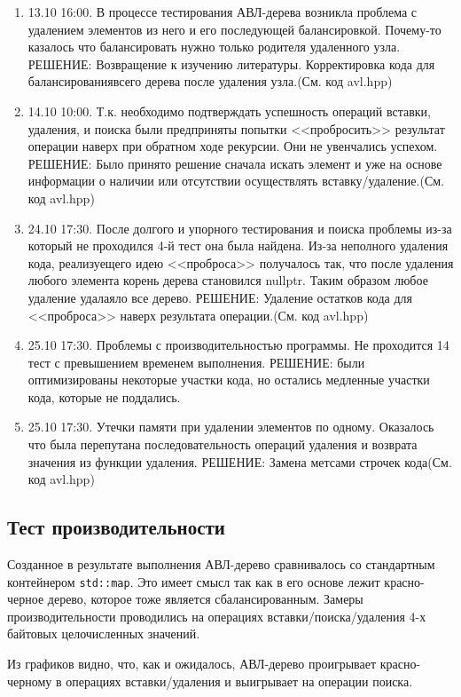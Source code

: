 \documentclass[12pt]{article}
\begin{document}
\begin{enumerate}
\item 13.10 16:00. В процессе тестирования АВЛ-дерева возникла проблема с удалением элементов из него и его последующей балансировкой. Почему-то казалось что балансировать нужно только родителя удаленного узла.
РЕШЕНИЕ: Возвращение к изучению литературы. Корректировка кода для балансированиявсего дерева после удаления узла.(См. код avl.hpp)
\item 14.10 10:00. Т.к. необходимо подтверждать успешность операций вставки, удаления, и поиска были предприняты попытки <<пробросить>> результат операции наверх при обратном ходе рекурсии.
Они не увенчались успехом.
РЕШЕНИЕ: Было принято решение сначала искать элемент и уже на основе информации о наличии или отсутствии осуществлять вставку/удаление.(См. код avl.hpp)
\item 24.10 17:30.
После долгого и упорного тестирования и поиска проблемы из-за который не проходился 4-й тест она была найдена. Из-за неполного удаления кода, реализуещего идею <<проброса>> получалось так, что после удаления любого элемента корень дерева становился nullptr. Таким образом любое удаление удалаяло все дерево.
РЕШЕНИЕ: Удаление остатков кода для <<проброса>> наверх результата операции.(См. код avl.hpp)
\item 25.10 17:30.
Проблемы с производительностью программы. Не проходится 14 тест с превышением временем выполнения. 
РЕШЕНИЕ: были оптимизированы некоторые участки кода, но остались медленные участки кода, которые не поддались.
\item 25.10 17:30.
Утечки памяти при удалении элементов по одному. Оказалось что была перепутана последовательность операций удаления и возврата значения из функции удаления.
РЕШЕНИЕ: Замена метсами строчек кода(См. код avl.hpp)

\end{enumerate}

\subsection*{Тест производительности}

Созданное в результате выполнения АВЛ-дерево сравнивалось со стандартным контейнером \verb|std::map|. Это имеет смысл так как в его основе лежит красно-черное дерево, которое тоже является сбалансированным.
Замеры производительности проводились на операциях вставки/поиска/удаления 4-х байтовых целочисленных значений.  

Из графиков видно, что, как и ожидалось, АВЛ-дерево проигрывает красно-черному в операциях вставки/удаления и выигрывает на операции поиска.
\end{document}
